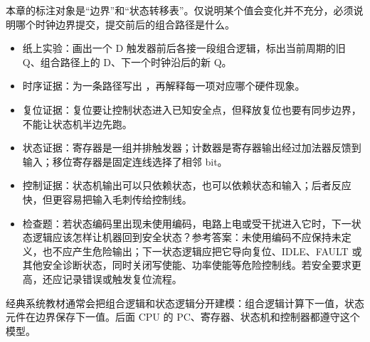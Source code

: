\begin{classicnote}
本章的标注对象是“边界”和“状态转移表”。仅说明某个值会变化并不充分，必须说明哪个时钟边界提交，提交前后的组合路径是什么。

\begin{itemize}
\item 纸上实验：画出一个 D 触发器前后各接一段组合逻辑，标出当前周期的旧 Q、组合路径上的 D、下一个时钟沿后的新 Q。
\item 时序证据：为一条路径写出 ，再解释每一项对应哪个硬件现象。
\item 复位证据：复位要让控制状态进入已知安全点，但释放复位也要有同步边界，不能让状态机半边先跑。
\item 状态证据：寄存器是一组并排触发器；计数器是寄存器输出经过加法器反馈到输入；移位寄存器是固定连线选择了相邻 bit。
\item 控制证据：状态机输出可以只依赖状态，也可以依赖状态和输入；后者反应快，但更容易把输入毛刺传给控制线。
\item 检查题：若状态编码里出现未使用编码，电路上电或受干扰进入它时，下一状态逻辑应该怎样让机器回到安全状态？参考答案：未使用编码不应保持未定义，也不应产生危险输出；下一状态逻辑应把它导向复位、IDLE、FAULT 或其他安全诊断状态，同时关闭写使能、功率使能等危险控制线。若安全要求更高，还应记录错误或触发复位流程。
\end{itemize}

经典系统教材通常会把组合逻辑和状态逻辑分开建模：组合逻辑计算下一值，状态元件在边界保存下一值。后面 CPU 的 PC、寄存器、状态机和控制器都遵守这个模型。
\end{classicnote}
